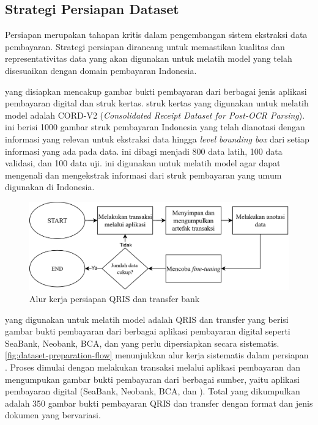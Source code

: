 \subsection{Strategi Persiapan Dataset}
\label{subsec:strategi-persiapan-dataset}

Persiapan \dataset{} merupakan tahapan kritis dalam pengembangan sistem ekstraksi data pembayaran. Strategi persiapan \dataset{} dirancang untuk memastikan kualitas dan representativitas data yang akan digunakan untuk melatih model \donut{} yang telah disesuaikan dengan domain pembayaran Indonesia.

\datasetfl{} yang disiapkan mencakup gambar bukti pembayaran dari berbagai jenis aplikasi pembayaran digital dan struk kertas. \datasetfl{} struk kertas yang digunakan untuk melatih model \donut{} adalah \dataset{} CORD-V2 (\emph{Consolidated Receipt Dataset for Post-OCR Parsing}). \datasetfl{} ini berisi 1000 gambar struk pembayaran Indonesia yang telah dianotasi dengan informasi yang relevan untuk ekstraksi data hingga \emph{level bounding box} dari setiap informasi yang ada pada data. \datasetfl{} ini dibagi menjadi 800 data latih, 100 data validasi, dan 100 data uji. \datasetfl{} ini digunakan untuk melatih model \donut{} agar dapat mengenali dan mengekstrak informasi dari struk pembayaran yang umum digunakan di Indonesia. 
\begin{figure}[htbp]
    \centering
    \includegraphics[width=1\textwidth]{images/dataset-preparation-flow.png}
    \caption{Alur kerja persiapan \dataset{} QRIS dan transfer bank}
    \label{fig:dataset-preparation-flow}
\end{figure}

\datasetfl{} yang digunakan untuk melatih model \donut{} adalah \dataset{} QRIS dan transfer yang berisi gambar bukti pembayaran dari berbagai aplikasi pembayaran digital seperti SeaBank, Neobank, BCA, dan \gopay{} yang perlu dipersiapkan secara sistematis. \autoref{fig:dataset-preparation-flow} menunjukkan alur kerja sistematis dalam persiapan \dataset. Proses dimulai dengan melakukan transaksi melalui aplikasi pembayaran dan mengumpukan gambar bukti pembayaran dari berbagai sumber, yaitu aplikasi pembayaran digital (SeaBank, Neobank, BCA, dan \gopay). Total \dataset{} yang dikumpulkan adalah 350 gambar bukti pembayaran QRIS dan transfer dengan format dan jenis dokumen yang bervariasi.

